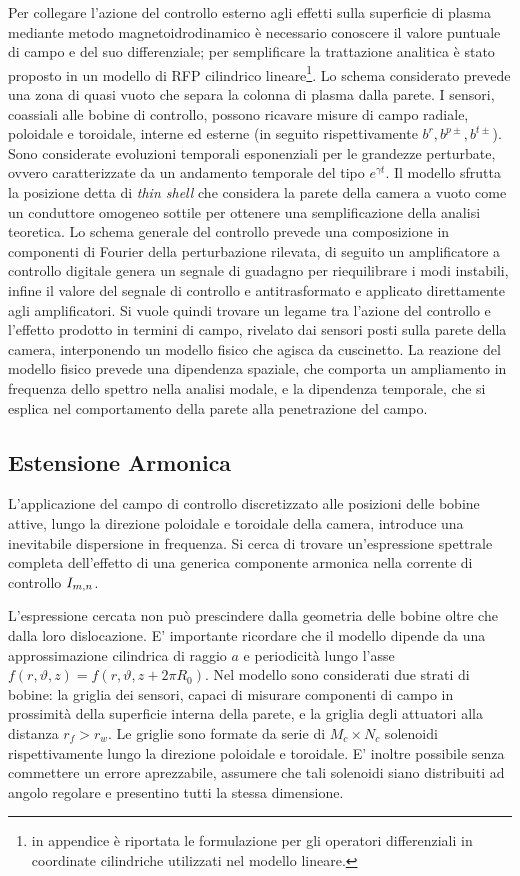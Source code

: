 
Per collegare l'azione del controllo esterno agli effetti sulla
superficie di plasma mediante metodo magnetoidrodinamico è necessario
conoscere il valore puntuale di campo e del suo differenziale; per
semplificare la trattazione analitica è stato proposto in \cite{pizz81}
un modello di RFP cilindrico lineare\footnote{in appendice è riportata
le formulazione per gli operatori differenziali in coordinate
cilindriche utilizzati nel modello lineare.}. Lo schema considerato
prevede una zona di quasi vuoto che separa la colonna di plasma dalla
parete.  I sensori, coassiali alle bobine di controllo, possono ricavare
misure di campo radiale, poloidale e toroidale, interne ed esterne (in
seguito rispettivamente $b^r,b^{p\pm},b^{t\pm}$).  Sono considerate
evoluzioni temporali esponenziali per le grandezze perturbate, ovvero
caratterizzate da un andamento temporale del tipo $e^{\gamma t}$. Il
modello sfrutta la posizione detta di \emph{thin shell} che considera la
parete della camera a vuoto come un conduttore omogeneo sottile per
ottenere una semplificazione della analisi teoretica.  Lo schema
generale del controllo prevede una composizione in componenti di Fourier
della perturbazione rilevata, di seguito un amplificatore a controllo
digitale genera un segnale di guadagno per riequilibrare i modi
instabili, infine il valore del segnale di controllo e antitrasformato e
applicato direttamente agli amplificatori.  Si vuole quindi trovare un
legame tra l'azione del controllo e l'effetto prodotto in termini di
campo, rivelato dai sensori posti sulla parete della camera,
interponendo un modello fisico che agisca da cuscinetto.  La reazione
del modello fisico prevede una dipendenza spaziale, che comporta un
ampliamento in frequenza dello spettro nella analisi modale, e la
dipendenza temporale, che si esplica nel comportamento della parete alla
penetrazione del campo.

\subsection{Estensione Armonica}

L'applicazione del campo di controllo discretizzato alle posizioni delle
bobine attive, lungo la direzione poloidale e toroidale della camera,
introduce una inevitabile dispersione in frequenza.
Si cerca di trovare un'espressione spettrale completa dell'effetto di
una generica componente armonica nella corrente di controllo $I_{m,n}$.

L'espressione cercata non può prescindere dalla geometria delle bobine
oltre che dalla loro dislocazione.  E' importante ricordare che il
modello dipende da una approssimazione cilindrica di raggio $a$ e
periodicità lungo l'asse $f(r,\vartheta,z) = f(r,\vartheta,z+2\pi
R_0)$. Nel modello sono considerati due strati di bobine: la griglia dei
sensori, capaci di misurare componenti di campo in prossimità della
superficie interna della parete, e la griglia degli attuatori alla
distanza $r_f > r_w$. Le griglie sono formate da serie di $M_c \times
N_c$ solenoidi rispettivamente lungo la direzione poloidale e toroidale.
E' inoltre possibile senza commettere un errore aprezzabile, assumere
che tali solenoidi siano distribuiti ad angolo regolare e presentino
tutti la stessa dimensione.

